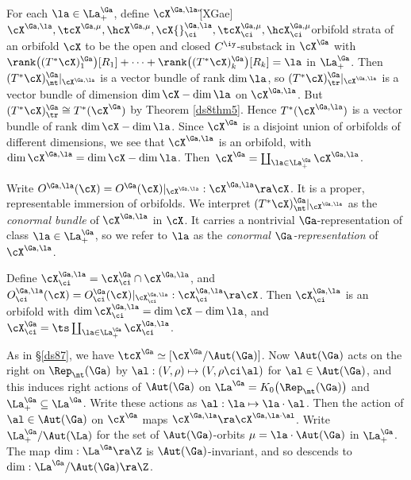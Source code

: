 \documentclass{article}
\begin{document}
\begin{dfn}
For each $\la\in\La^\Ga_+$, define
$\cX^{\Ga,\la}$\G[XGae]{$\cX^{\Ga,\la},\tcX^{\Ga,\mu},\hcX^{\Ga,\mu},
\cX{}^{\Ga,\la}_\ci,\tcX^{\Ga,\mu}_\ci,\hcX^{\Ga,\mu}_\ci$}{orbifold
strata of an orbifold $\cX$} to be the open and closed
$C^\iy$-substack in $\cX^\Ga$ with
$\rank\bigl((T^*\cX)^\Ga_1\bigr)[R_1]+\cdots+\rank\bigl((T^*\cX)^\Ga_k
\bigr)[R_k]=\la$ in $\La^\Ga_+$. Then
$(T^*\cX)^\Ga_\nt\vert_{\cX^{\Ga,\la}}$ is a vector bundle of rank
$\dim\la$, so $(T^*\cX)^\Ga_\tr\vert_{\smash{\cX^{\Ga,\la}}}$ is a
vector bundle of dimension $\dim\cX-\dim\la$ on $\cX^{\Ga,\la}$. But
$(T^*\cX)^\Ga_\tr\cong T^*(\cX^\Ga)$ by Theorem \ref{ds8thm5}. Hence
$T^*(\cX^{\Ga,\la})$ is a vector bundle of rank $\dim\cX-\dim\la$.
Since $\cX^\Ga$ is a disjoint union of orbifolds of different
dimensions, we see that $\cX^{\Ga,\la}$ is an orbifold, with
$\dim\cX^{\Ga,\la}=\dim\cX-\dim\la$.
Then~$\cX^\Ga=\coprod_{\la\in\La^\Ga_+}\cX^{\Ga,\la}$.

Write $O^{\Ga,\la}(\cX)=O^\Ga(\cX)\vert_{\smash{\cX^{\Ga,\la}}}:
\cX^{\Ga,\la}\ra\cX$. It is a proper, representable immersion of
orbifolds. We interpret $(T^*\cX)^\Ga_\nt
\vert_{\smash{\cX^{\Ga,\la}}}$ as the {\it conormal bundle\/} of
$\cX^{\Ga,\la}$ in $\cX$. It carries a nontrivial
$\Ga$-representation of class $\la\in\La^\Ga_+$, so we refer to
$\la$ as the {\it conormal\/ $\Ga$-representation}
of~$\cX^{\Ga,\la}$.

Define $\cX^{\Ga,\la}_\ci=\cX^\Ga_\ci\cap\cX^{\Ga,\la}$, and
$O^{\Ga,\la}_\ci(\cX)=O^\Ga_\ci(\cX)\vert_{\smash{\cX^{\Ga,\la}_\ci}}:
\cX^{\Ga,\la}_\ci\ra\cX$. Then $\cX^{\Ga,\la}_\ci$ is an orbifold
with $\dim\cX^{\Ga,\la}_\ci=\dim\cX-\dim\la$, and
$\cX^\Ga_\ci=\ts\coprod_{\smash{\la\in\La^\Ga_+}}\cX^{\Ga,\la}_\ci$.

As in \S\ref{ds87}, we have $\tcX^\Ga\simeq[\cX^\Ga/ \Aut(\Ga)]$.
Now $\Aut(\Ga)$ acts on the right on $\Rep_\nt(\Ga)$ by
$\al:(V,\rho)\mapsto (V,\rho\ci\al)$ for $\al\in\Aut(\Ga)$, and this
induces right actions of $\Aut(\Ga)$ on
$\La^\Ga=K_0\bigl(\Rep_\nt(\Ga)\bigr)$ and
$\La^\Ga_+\subseteq\La^\Ga$. Write these actions as
$\al:\la\mapsto\la\cdot\al$. Then the action of $\al\in\Aut(\Ga)$ on
$\cX^\Ga$ maps $\cX^{\Ga,\la}\ra \cX^{\Ga,\la\cdot\al}$. Write
$\La^\Ga_+/\Aut(\La)$ for the set of $\Aut(\Ga)$-orbits
$\mu=\la\cdot\Aut(\Ga)$ in $\La^\Ga_+$. The map $\dim:\La^\Ga\ra\Z$
is $\Aut(\Ga)$-invariant, and so descends
to~$\dim:\La^\Ga/\Aut(\Ga)\ra\Z$.


\end{dfn}
\end{document}
